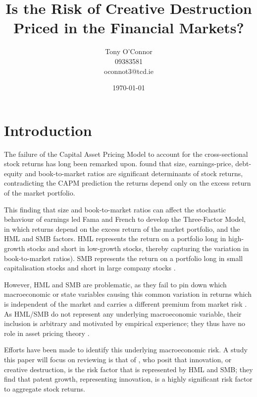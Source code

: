 \documentclass[12pt]{article}
\begin{document}
\title{Is the Risk of Creative Destruction Priced in the Financial Markets?}
\author{Tony O'Connor \\
   09383581\\
   oconnot3@tcd.ie}
\date{\today}



\maketitle

\section{Introduction}
The failure of the Capital Asset Pricing Model to account for the cross-sectional stock returns has long been remarked upon.  \cite{fama1992} found that size, earnings-price, debt-equity and book-to-market ratios are significant determinants of stock returns, contradicting the CAPM prediction the returns depend only on the excess return of the market portfolio. 

This finding that size and book-to-market ratios can affect the stochastic behaviour of earnings led Fama and French to develop the Three-Factor Model, in which returns depend on the excess return of the market portfolio, and the HML and SMB factors. HML represents the return on a portfolio long in high-growth stocks and short in low-growth stocks, thereby capturing the variation in book-to-market ratios). SMB represents the return on a portfolio long in small capitalisation stocks and short in large company stocks \cite{grammig2010}.

However, HML and SMB are problematic, as they fail to pin down which macroeconomic or state variables causing this common variation in returns which is independent of the market and carries a different premium from market risk \citep{famafrench1993}. As HML/SMB do not represent any underlying macroeconomic variable, their inclusion is arbitrary and motivated by empirical experience; they thus have no role in asset pricing theory \citep{fama1992}.  

Efforts have been made to identify this underlying macroeconomic risk.  A study this paper will focus on reviewing is that of \citet{grammig2010}, who posit that innovation, or creative destruction, is the risk factor that is represented by HML and SMB; they find that patent growth, representing innovation, is a highly significant risk factor to aggregate stock returns. 
\end{document}
